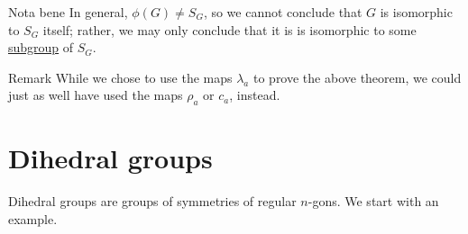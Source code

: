 \begin{df}{Nota bene} In general, $\phi(G) \neq S_G$, so we cannot
conclude that $G$ is isomorphic to $S_G$ itself; rather, we may only
conclude that it is is isomorphic to some \underline{subgroup} of
$S_G$.\end{df}

\begin{df}{Remark} While we chose to use the maps $\lambda_a$ to
prove the above theorem, we could just as well have used the maps
$\rho_a$ or $c_a$, instead.\end{df}


\section{Dihedral groups}\label{dihedralgps}

Dihedral groups are groups of symmetries of regular $n$-gons.  We start with an example.


